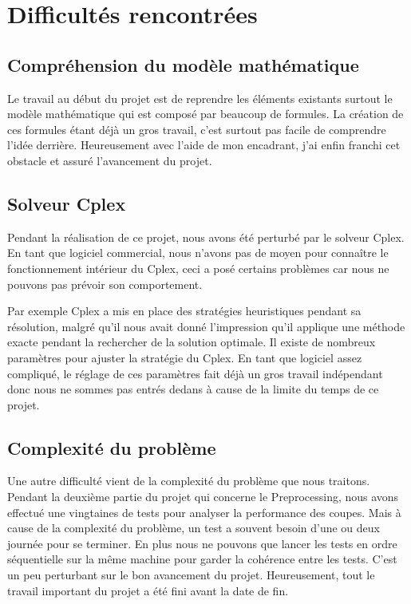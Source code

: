 \chapter{Difficultés rencontrées}
\section{Compréhension du modèle mathématique}
Le travail au début du projet est de reprendre les éléments existants surtout le modèle mathématique qui est composé par beaucoup de formules. La création de ces formules étant déjà un gros travail, c'est surtout pas facile de comprendre l'idée derrière. Heureusement avec l'aide de mon encadrant, j'ai enfin franchi cet obstacle et assuré l'avancement du projet.

\section{Solveur Cplex}
Pendant la réalisation de ce projet, nous avons été perturbé par le solveur Cplex. En tant que logiciel commercial, nous n'avons pas de moyen pour connaître le fonctionnement intérieur du Cplex, ceci a posé certains problèmes car nous ne pouvons pas prévoir son comportement.

Par exemple Cplex a mis en place des stratégies heuristiques pendant sa résolution, malgré qu'il nous avait donné l'impression qu'il applique une méthode exacte pendant la rechercher de la solution optimale. Il existe de nombreux paramètres pour ajuster la stratégie du Cplex. En tant que logiciel assez compliqué, le réglage de ces paramètres fait déjà un gros travail indépendant donc nous ne sommes pas entrés dedans à cause de la limite du temps de ce projet.

\section{Complexité du problème}
Une autre difficulté vient de la complexité du problème que nous traitons. Pendant la deuxième partie du projet qui concerne le Preprocessing, nous avons effectué une vingtaines de tests pour analyser la performance des coupes. Mais à cause de la complexité du problème, un test a souvent besoin d'une ou deux journée pour se terminer. En plus nous ne pouvons que lancer les tests en ordre séquentielle sur la même machine pour garder la cohérence entre les tests. C'est un peu perturbant sur le bon avancement du projet. Heureusement, tout le travail important du projet a été fini avant la date de fin.


